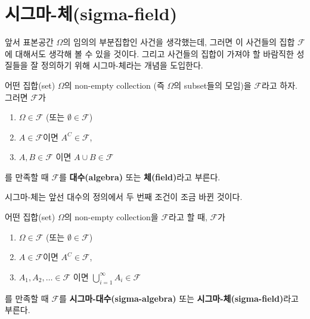 \documentclass[b5paper,]{book}
\theoremstyle{definition}
\theoremstyle{definition}
\theoremstyle{definition}
\theoremstyle{remark}
\let\BeginKnitrBlock\begin \let\EndKnitrBlock\end
\begin{document}
\section{시그마-체(sigma-field)}\label{-sigma-field}

앞서 표본공간 \(\Omega\)의 임의의 부분집합인 사건을 생각했는데, 그러면
이 사건들의 집합 \(\mathcal{F}\)에 대해서도 생각해 볼 수 있을 것이다.
그리고 사건들의 집합이 가져야 할 바람직한 성질들을 잘 정의하기 위해
시그마-체라는 개념을 도입한다.

\BeginKnitrBlock{definition}[대수(체)]
\protect\hypertarget{def:unnamed-chunk-16}{}{\label{def:unnamed-chunk-16}
{} }어떤 집합(set) \(\Omega\)의 non-empty
collection (즉 \(\Omega\)의 subset들의 모임)을 \(\mathcal{F}\)라고 하자.
그러면 \(\mathcal{F}\)가

\begin{enumerate}
\def\labelenumi{\arabic{enumi}.}
\item
  \(\Omega \in \mathcal{F}\) (또는 \(\emptyset \in \mathcal{F}\))
\item
  \(A \in \mathcal{F}\)이면 \(A^{C} \in \mathcal{F}\),
\item
  \(A, B \in \mathcal{F}\) 이면 \(A\cup B \in \mathcal{F}\)
\end{enumerate}

를 만족할 때 \(\mathcal{F}\)를 \textbf{대수(algebra)} 또는
\textbf{체(field)}라고 부른다.
\EndKnitrBlock{definition}

시그마-체는 앞선 대수의 정의에서 두 번째 조건이 조금 바뀐 것이다.

\BeginKnitrBlock{definition}[시그마-체]
\protect\hypertarget{def:unnamed-chunk-17}{}{\label{def:unnamed-chunk-17}
{} }어떤 집합(set) \(\Omega\)의 non-empty
collection을 \(\mathcal{F}\)라고 할 때, \(\mathcal{F}\)가

\begin{enumerate}
\def\labelenumi{\arabic{enumi}.}
\item
  \(\Omega \in \mathcal{F}\) (또는 \(\emptyset \in \mathcal{F}\))
\item
  \(A \in \mathcal{F}\)이면 \(A^{C} \in \mathcal{F}\),
\item
  \(A_{1}, A_{2}, \ldots \in \mathcal{F}\) 이면
  \(\bigcup_{i=1}^{\infty}A_{i} \in \mathcal{F}\)
\end{enumerate}

를 만족할 때 \(\mathcal{F}\)를 \textbf{시그마-대수(sigma-algebra)} 또는
\textbf{시그마-체(sigma-field)}라고 부른다.
\EndKnitrBlock{definition}
\end{document}
